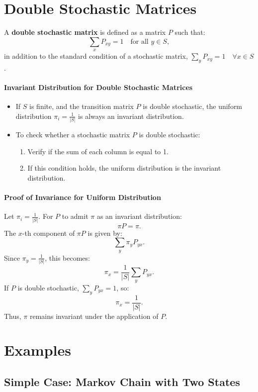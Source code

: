 \section{Double Stochastic Matrices}

A \textbf{double stochastic matrix} is defined as a matrix \( P \) such that:
\[
\sum_x P_{xy} = 1 \quad \text{for all } y \in S,
\]
in addition to the standard condition of a stochastic matrix, \( \sum_y P_{xy} = 1 \quad \forall x \in S \).

\paragraph{Invariant Distribution for Double Stochastic Matrices}
\begin{itemize}
    \item If \( S \) is finite, and the transition matrix \( P \) is double stochastic, the uniform distribution \( \pi_i = \frac{1}{|S|} \) is always an invariant distribution.
    \item To check whether a stochastic matrix \( P \) is double stochastic:
        \begin{enumerate}
            \item Verify if the sum of each column is equal to 1.
            \item If this condition holds, the uniform distribution is the invariant distribution.
        \end{enumerate}
\end{itemize}

\paragraph{Proof of Invariance for Uniform Distribution}
Let \( \pi_i = \frac{1}{|S|} \). For \( P \) to admit \( \pi \) as an invariant distribution:
\[
\pi P = \pi.
\]
The \( x \)-th component of \( \pi P \) is given by:
\[
\sum_y \pi_y P_{yx}.
\]
Since \( \pi_y = \frac{1}{|S|} \), this becomes:
\[
\pi_x = \frac{1}{|S|} \sum_y P_{yx}.
\]
If \( P \) is double stochastic, \( \sum_y P_{yx} = 1 \), so:
\[
\pi_x = \frac{1}{|S|}.
\]
Thus, \( \pi \) remains invariant under the application of \( P \).
\section{Examples}
\subsection{Simple Case: Markov Chain with Two States}

